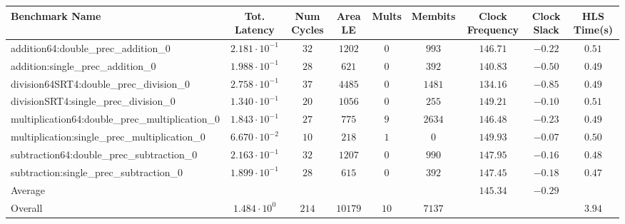 \begin{tabular}{|l|c|c|c|c|c|c|c|c|}
\hline
Benchmark Name                                   & Tot. Latency            & Num Cycles & Area LE   & Mults  & Membits  & Clock Frequency & Clock Slack & HLS Time(s) \\
\hline
addition64:double\_prec\_addition\_0             & $ 2.181 \cdot 10^{-1} $ & $ 32     $ & $ 1202  $ & $ 0  $ & $ 993  $ & $ 146.71      $ & $ -0.22   $ & $ 0.51    $ \\
addition:single\_prec\_addition\_0               & $ 1.988 \cdot 10^{-1} $ & $ 28     $ & $ 621   $ & $ 0  $ & $ 392  $ & $ 140.83      $ & $ -0.50   $ & $ 0.49    $ \\
division64SRT4:double\_prec\_division\_0         & $ 2.758 \cdot 10^{-1} $ & $ 37     $ & $ 4485  $ & $ 0  $ & $ 1481 $ & $ 134.16      $ & $ -0.85   $ & $ 0.49    $ \\
divisionSRT4:single\_prec\_division\_0           & $ 1.340 \cdot 10^{-1} $ & $ 20     $ & $ 1056  $ & $ 0  $ & $ 255  $ & $ 149.21      $ & $ -0.10   $ & $ 0.51    $ \\
multiplication64:double\_prec\_multiplication\_0 & $ 1.843 \cdot 10^{-1} $ & $ 27     $ & $ 775   $ & $ 9  $ & $ 2634 $ & $ 146.48      $ & $ -0.23   $ & $ 0.49    $ \\
multiplication:single\_prec\_multiplication\_0   & $ 6.670 \cdot 10^{-2} $ & $ 10     $ & $ 218   $ & $ 1  $ & $ 0    $ & $ 149.93      $ & $ -0.07   $ & $ 0.50    $ \\
subtraction64:double\_prec\_subtraction\_0       & $ 2.163 \cdot 10^{-1} $ & $ 32     $ & $ 1207  $ & $ 0  $ & $ 990  $ & $ 147.95      $ & $ -0.16   $ & $ 0.48    $ \\
subtraction:single\_prec\_subtraction\_0         & $ 1.899 \cdot 10^{-1} $ & $ 28     $ & $ 615   $ & $ 0  $ & $ 392  $ & $ 147.45      $ & $ -0.18   $ & $ 0.47    $ \\
\hline
Average                                          & $                     $ & $        $ & $       $ & $    $ & $      $ & $ 145.34      $ & $ -0.29   $ & $         $ \\
\hline
Overall                                          & $ 1.484 \cdot 10^{0}  $ & $ 214    $ & $ 10179 $ & $ 10 $ & $ 7137 $ & $             $ & $         $ & $ 3.94    $ \\
\hline
\end{tabular}
